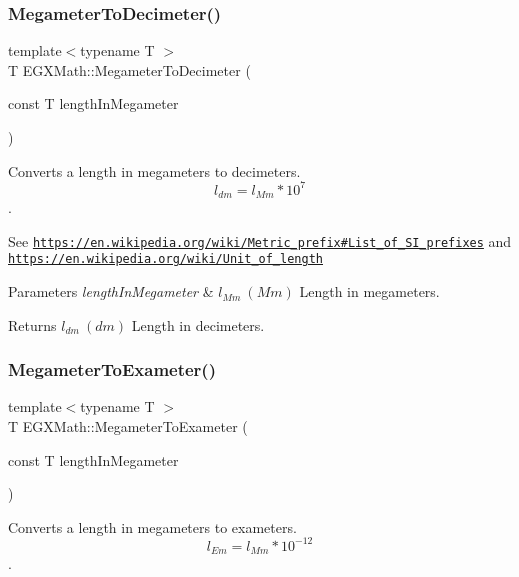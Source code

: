\subsubsection{\texorpdfstring{Megameter\+To\+Decimeter()}{MegameterToDecimeter()}}
{\footnotesize\ttfamily template$<$typename T $>$ \\
T E\+G\+X\+Math\+::\+Megameter\+To\+Decimeter (\begin{DoxyParamCaption}\item[{const T}]{length\+In\+Megameter }\end{DoxyParamCaption})}



Converts a length in megameters to decimeters. \[ l_{dm}=l_{Mm} * 10^{7} \]. 

See \href{https://en.wikipedia.org/wiki/Metric_prefix#List_of_SI_prefixes}{\tt https\+://en.\+wikipedia.\+org/wiki/\+Metric\+\_\+prefix\#\+List\+\_\+of\+\_\+\+S\+I\+\_\+prefixes} and \href{https://en.wikipedia.org/wiki/Unit_of_length}{\tt https\+://en.\+wikipedia.\+org/wiki/\+Unit\+\_\+of\+\_\+length} 
\begin{DoxyParams}{Parameters}
{\em length\+In\+Megameter} & $ l_{Mm}\ (Mm)$ Length in megameters. \\
\hline
\end{DoxyParams}
\begin{DoxyReturn}{Returns}
$ l_{dm}\ (dm)$ Length in decimeters. 
\end{DoxyReturn}
\mbox{\label{group___e_g_x_math-_conversions-_length_conversions-_megameter-_s_i_ga30aed22a379d3215a2d660a4219c6936}} 
\subsubsection{\texorpdfstring{Megameter\+To\+Exameter()}{MegameterToExameter()}}
{\footnotesize\ttfamily template$<$typename T $>$ \\
T E\+G\+X\+Math\+::\+Megameter\+To\+Exameter (\begin{DoxyParamCaption}\item[{const T}]{length\+In\+Megameter }\end{DoxyParamCaption})}



Converts a length in megameters to exameters. \[ l_{Em}=l_{Mm} * 10^{-12} \]. 

